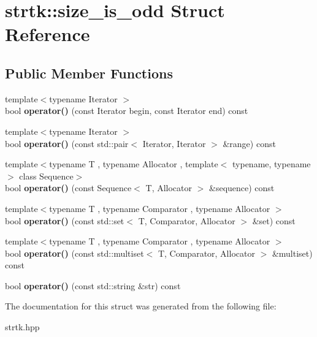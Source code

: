 \hypertarget{structstrtk_1_1size__is__odd}{\section{strtk\-:\-:size\-\_\-is\-\_\-odd Struct Reference}
\label{structstrtk_1_1size__is__odd}
}
\subsection*{Public Member Functions}
\begin{DoxyCompactItemize}
\item 
\hypertarget{structstrtk_1_1size__is__odd_a6c1dea4afc729808d4763dcb7d5e54df}{{\footnotesize template$<$typename Iterator $>$ }\\bool {\bfseries operator()} (const Iterator begin, const Iterator end) const }\label{structstrtk_1_1size__is__odd_a6c1dea4afc729808d4763dcb7d5e54df}

\item 
\hypertarget{structstrtk_1_1size__is__odd_ad57e505d24b9649cf43453b9f1bf120a}{{\footnotesize template$<$typename Iterator $>$ }\\bool {\bfseries operator()} (const std\-::pair$<$ Iterator, Iterator $>$ \&range) const }\label{structstrtk_1_1size__is__odd_ad57e505d24b9649cf43453b9f1bf120a}

\item 
\hypertarget{structstrtk_1_1size__is__odd_ac7f8632f789d2365afac420746b50063}{{\footnotesize template$<$typename T , typename Allocator , template$<$ typename, typename $>$ class Sequence$>$ }\\bool {\bfseries operator()} (const Sequence$<$ T, Allocator $>$ \&sequence) const }\label{structstrtk_1_1size__is__odd_ac7f8632f789d2365afac420746b50063}

\item 
\hypertarget{structstrtk_1_1size__is__odd_a4985a27472a56ab9dac0425c82398670}{{\footnotesize template$<$typename T , typename Comparator , typename Allocator $>$ }\\bool {\bfseries operator()} (const std\-::set$<$ T, Comparator, Allocator $>$ \&set) const }\label{structstrtk_1_1size__is__odd_a4985a27472a56ab9dac0425c82398670}

\item 
\hypertarget{structstrtk_1_1size__is__odd_a840c175f70bf34a3c1ee8bb840d5082d}{{\footnotesize template$<$typename T , typename Comparator , typename Allocator $>$ }\\bool {\bfseries operator()} (const std\-::multiset$<$ T, Comparator, Allocator $>$ \&multiset) const }\label{structstrtk_1_1size__is__odd_a840c175f70bf34a3c1ee8bb840d5082d}

\item 
\hypertarget{structstrtk_1_1size__is__odd_a7e96e0bbe69577dbdf397d103d6085ac}{bool {\bfseries operator()} (const std\-::string \&str) const }\label{structstrtk_1_1size__is__odd_a7e96e0bbe69577dbdf397d103d6085ac}

\end{DoxyCompactItemize}


The documentation for this struct was generated from the following file\-:\begin{DoxyCompactItemize}
\item 
strtk.\-hpp\end{DoxyCompactItemize}
